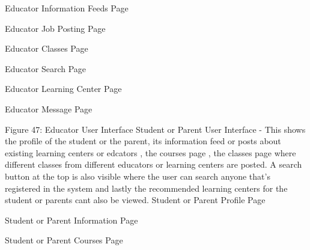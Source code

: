 Educator Information Feeds Page 







Educator Job Posting Page












Educator Classes Page 









Educator Search Page 










Educator Learning Center Page



	




Educator Message Page 










Figure 47: Educator User Interface
Student or Parent User Interface - This shows the profile of the student or the parent, its information feed or posts about existing learning centers or edcators , the courses page , the classes page where different classes from different educators or learning centers are posted. A search button at the top is also visible where the user can search anyone that’s registered in the system and lastly the recommended learning centers for the student or parents cant also be viewed.
Student or Parent Profile Page 

















Student or Parent Information Page
 
Student or Parent Courses Page












